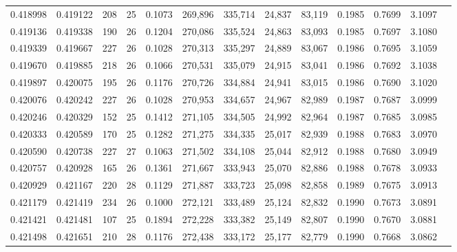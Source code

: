 \begin{tabular}{rrrrrrrrrrrrr}
0.418998 & 0.419122 &   208 &  25 &                                     0.1073 & 269,896 & 335,714 &  24,837 &  83,119 & 0.1985 & 0.7699 & 3.1097 \\
0.419136 & 0.419338 &   190 &  26 &                                     0.1204 & 270,086 & 335,524 &  24,863 &  83,093 & 0.1985 & 0.7697 & 3.1080 \\
0.419339 & 0.419667 &   227 &  26 &                                     0.1028 & 270,313 & 335,297 &  24,889 &  83,067 & 0.1986 & 0.7695 & 3.1059 \\
0.419670 & 0.419885 &   218 &  26 &                                     0.1066 & 270,531 & 335,079 &  24,915 &  83,041 & 0.1986 & 0.7692 & 3.1038 \\
0.419897 & 0.420075 &   195 &  26 &                                     0.1176 & 270,726 & 334,884 &  24,941 &  83,015 & 0.1986 & 0.7690 & 3.1020 \\
0.420076 & 0.420242 &   227 &  26 &                                     0.1028 & 270,953 & 334,657 &  24,967 &  82,989 & 0.1987 & 0.7687 & 3.0999 \\
0.420246 & 0.420329 &   152 &  25 &                                     0.1412 & 271,105 & 334,505 &  24,992 &  82,964 & 0.1987 & 0.7685 & 3.0985 \\
0.420333 & 0.420589 &   170 &  25 &                                     0.1282 & 271,275 & 334,335 &  25,017 &  82,939 & 0.1988 & 0.7683 & 3.0970 \\
0.420590 & 0.420738 &   227 &  27 &                                     0.1063 & 271,502 & 334,108 &  25,044 &  82,912 & 0.1988 & 0.7680 & 3.0949 \\
0.420757 & 0.420928 &   165 &  26 &                                     0.1361 & 271,667 & 333,943 &  25,070 &  82,886 & 0.1988 & 0.7678 & 3.0933 \\
0.420929 & 0.421167 &   220 &  28 &                                     0.1129 & 271,887 & 333,723 &  25,098 &  82,858 & 0.1989 & 0.7675 & 3.0913 \\
0.421179 & 0.421419 &   234 &  26 &                                     0.1000 & 272,121 & 333,489 &  25,124 &  82,832 & 0.1990 & 0.7673 & 3.0891 \\
0.421421 & 0.421481 &   107 &  25 &                                     0.1894 & 272,228 & 333,382 &  25,149 &  82,807 & 0.1990 & 0.7670 & 3.0881 \\
0.421498 & 0.421651 &   210 &  28 &                                     0.1176 & 272,438 & 333,172 &  25,177 &  82,779 & 0.1990 & 0.7668 & 3.0862 \\

\end{tabular}
